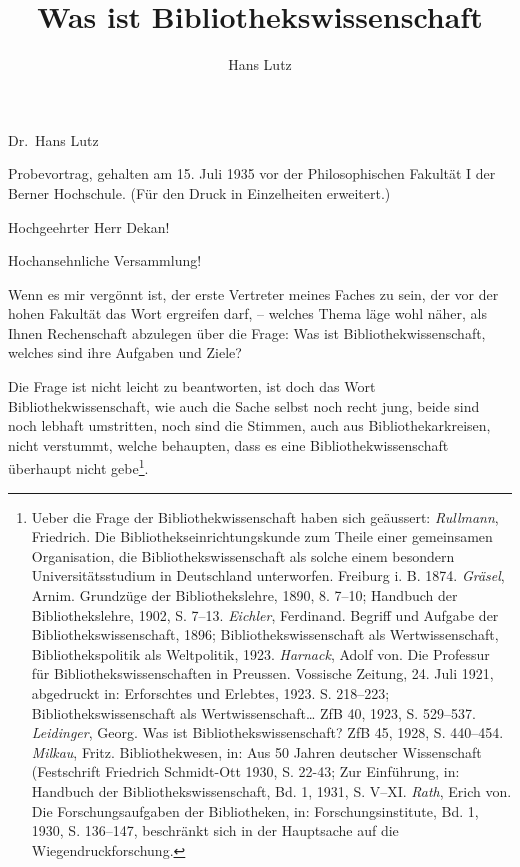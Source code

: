 \documentclass[a4paper,
fontsize=11pt,
oneside,
numbers=noperiodatend,
parskip=half-,
bibliography=totoc,
final
]{scrartcl}
\title{\LARGE{Was ist Bibliothekswissenschaft}}%
\author{Hans Lutz} %
\date{}
\begin{document}
\maketitle
\thispagestyle{fancyplain} 


Dr.~Hans Lutz

Probevortrag, gehalten am 15. Juli 1935 vor der Philosophischen Fakultät
I der Berner Hochschule. (Für den Druck in Einzelheiten erweitert.)

Hochgeehrter Herr Dekan!

Hochansehnliche Versammlung!

Wenn es mir vergönnt ist, der erste Vertreter meines Faches zu sein, der
vor der hohen Fakultät das Wort ergreifen darf, -- welches Thema läge
wohl näher, als Ihnen Rechenschaft abzulegen über die Frage: Was ist
Bibliothekwissenschaft, welches sind ihre Aufgaben und Ziele?

Die Frage ist nicht leicht zu beantworten, ist doch das Wort
Bibliothekwissenschaft, wie auch die Sache selbst noch recht jung, beide
sind noch lebhaft umstritten, noch sind die Stimmen, auch aus
Bibliothekarkreisen, nicht verstummt, welche behaupten, dass es eine
Bibliothekwissenschaft überhaupt nicht gebe\footnote{Ueber die Frage der
  Bibliothekwissenschaft haben sich geäussert: \emph{Rullmann},
  Friedrich. Die Bibliothekseinrichtungskunde zum Theile einer
  gemeinsamen Organisation, die Bibliothekswissenschaft als solche einem
  besondern Universitätsstudium in Deutschland unterworfen. Freiburg i.
  B. 1874. \emph{Gräsel}, Arnim. Grundzüge der Bibliothekslehre, 1890,
  8. 7--10; Handbuch der Bibliothekslehre, 1902, S. 7--13.
  \emph{Eichler}, Ferdinand. Begriff und Aufgabe der
  Bibliothekswissenschaft, 1896; Bibliothekswissenschaft als
  Wertwissenschaft, Bibliothekspolitik als Weltpolitik, 1923.
  \emph{Harnack}, Adolf von. Die Professur für Bibliothekswissenschaften
  in Preussen. Vossische Zeitung, 24. Juli 1921, abgedruckt in:
  Erforschtes und Erlebtes, 1923. S. 218--223; Bibliothekswissenschaft
  als Wertwissenschaft\ldots{} ZfB 40, 1923, S. 529--537.
  \emph{Leidinger}, Georg. Was ist Bibliothekswissenschaft? ZfB 45,
  1928, S. 440--454. \emph{Milkau}, Fritz. Bibliothekwesen, in: Aus 50
  Jahren deutscher Wissenschaft (Festschrift Friedrich Schmidt-Ott 1930,
  S. 22-43; Zur Einführung, in: Handbuch der Bibliothekswissenschaft,
  Bd. 1, 1931, S. V--XI. \emph{Rath}, Erich von. Die Forschungsaufgaben
  der Bibliotheken, in: Forschungsinstitute, Bd. 1, 1930, S. 136--147,
  beschränkt sich in der Hauptsache auf die Wiegendruckforschung.}.
\end{document}
